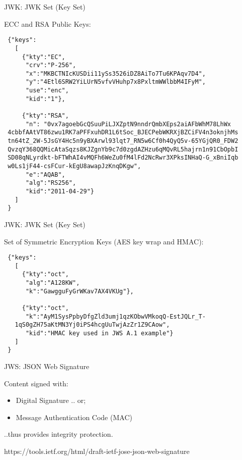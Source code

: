 \begin{frame}[fragile]{JWK: JWK Set (Key Set)}

ECC and RSA Public Keys:

\tiny

\begin{verbatim}
 {"keys":
   [
     {"kty":"EC",
      "crv":"P-256",
      "x":"MKBCTNIcKUSDii11ySs3526iDZ8AiTo7Tu6KPAqv7D4",
      "y":"4Etl6SRW2YiLUrN5vfvVHuhp7x8PxltmWWlbbM4IFyM",
      "use":"enc",
      "kid":"1"},

     {"kty":"RSA",
      "n": "0vx7agoebGcQSuuPiLJXZptN9nndrQmbXEps2aiAFbWhM78LhWx
 4cbbfAAtVT86zwu1RK7aPFFxuhDR1L6tSoc_BJECPebWKRXjBZCiFV4n3oknjhMs
 tn64tZ_2W-5JsGY4Hc5n9yBXArwl93lqt7_RN5w6Cf0h4QyQ5v-65YGjQR0_FDW2
 QvzqY368QQMicAtaSqzs8KJZgnYb9c7d0zgdAZHzu6qMQvRL5hajrn1n91CbOpbI
 SD08qNLyrdkt-bFTWhAI4vMQFh6WeZu0fM4lFd2NcRwr3XPksINHaQ-G_xBniIqb
 w0Ls1jF44-csFCur-kEgU8awapJzKnqDKgw",
      "e":"AQAB",
      "alg":"RS256",
      "kid":"2011-04-29"}
   ]
 }
\end{verbatim}

\end{frame}

\begin{frame}[fragile]{JWK: JWK Set (Key Set)}

Set of Symmetric Encryption Keys (AES key wrap and HMAC):

\small

\begin{verbatim}
 {"keys":
   [
     {"kty":"oct",
      "alg":"A128KW",
      "k":"GawgguFyGrWKav7AX4VKUg"},

     {"kty":"oct",
      "k":"AyM1SysPpbyDfgZld3umj1qzKObwVMkoqQ-EstJQLr_T-
   1qS0gZH75aKtMN3Yj0iPS4hcgUuTwjAzZr1Z9CAow",
      "kid":"HMAC key used in JWS A.1 example"}
   ]
 }
\end{verbatim}

\end{frame}

\begin{frame}{JWS: JSON Web Signature}

Content signed with:

\begin{itemize}
\itemsep1pt\parskip0pt
\item
  Digital Signature .. or;
\item
  Message Authentication Code (MAC)
\end{itemize}

..thus provides integrity protection.

https://tools.ietf.org/html/draft-ietf-jose-json-web-signature

\end{frame}

